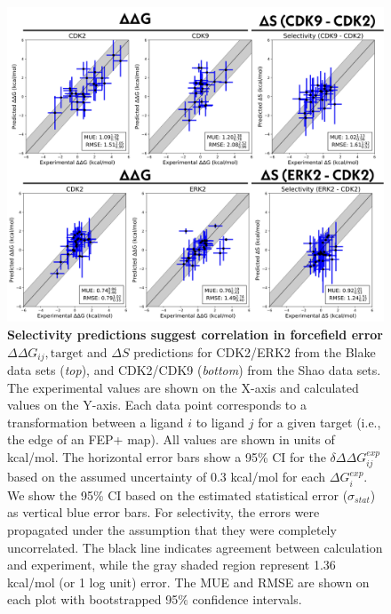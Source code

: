\documentclass[phd,tocprelim]{cornell}
\begin{document}
\begin{landscape}
\begin{figure}
\centering
\includegraphics[width=0.6\linewidth]{figures/Figure4.png}
\caption[Selectivity predictions suggest correlation in forcefield error.]{
{\bf Selectivity predictions suggest correlation in forcefield error} \\
$\Delta \Delta G_{ij}, \text{target}$ and $\Delta S$ predictions for CDK2/ERK2 from the Blake data sets (\emph{top}), and CDK2/CDK9 (\emph{bottom}) from the Shao data sets. The experimental values are shown on the X-axis and calculated values on the Y-axis. Each data point corresponds to a transformation between a ligand $i$ to ligand $j$ for a given target (i.e., the edge of an FEP+ map). All values are shown in units of kcal/mol. The horizontal error bars show a 95\% CI for the $\delta \Delta \Delta G^{exp}_{ij}$ based on the assumed uncertainty of 0.3 kcal/mol\citep{BROWN2009420,Kalliokoski:PloSOne:2013} for each $\Delta G^{exp}_{i}$. We show the 95\% CI based on the estimated statistical error ($\sigma_{stat}$) as vertical blue error bars. For selectivity, the errors were propagated under the assumption that they were completely uncorrelated. The black line indicates agreement between calculation and experiment, while the gray shaded region represent 1.36 kcal/mol (or 1 log unit) error. The MUE and RMSE are shown on each plot with bootstrapped 95$\%$ confidence intervals.
}
\label{fig:figure-4}
\end{figure}
\end{landscape}
\end{document}
